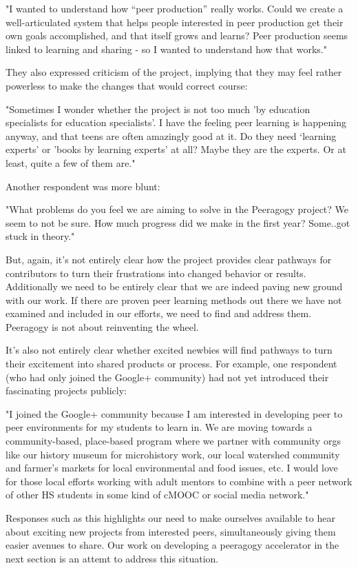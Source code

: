 \documentclass{acm_proc_article-sp}
\begin{document}
"I wanted to understand how ``peer production'' really works. Could we create a well-articulated system that helps people interested in peer production get their own goals accomplished, and that itself grows and learns? Peer production seems linked to learning and sharing - so I wanted to understand how that works."

They also expressed criticism of the project, implying that they may feel rather powerless to make the changes that would correct course:

"Sometimes I wonder whether the project is not too much 'by education specialists for education specialists'. I have the feeling peer learning is happening anyway, and that teens are often amazingly good at it. Do they need `learning experts' or 'books by learning experts' at all? Maybe they are the experts. Or at least, quite a few of them are."

Another respondent was more blunt:

"What problems do you feel we are aiming to solve in the Peeragogy project? We seem to not be sure. How much progress did we make in the first year? Some..got stuck in theory."

But, again, it's not entirely clear how the project provides clear pathways for contributors to turn their frustrations into changed behavior or results. Additionally we need to be entirely clear that we are indeed paving new ground with our work. If there are proven peer learning methods out there we have not examined and included in our efforts, we need to find and address them. Peeragogy is not about reinventing the wheel.

It's also not entirely clear whether excited newbies will find pathways to turn their excitement into shared products or process. For example, one respondent (who had only joined the Google+ community) had not yet introduced their fascinating projects publicly:

"I joined the Google+ community because I am interested in developing peer to peer environments for my students to learn in. We are moving towards a community-based, place-based program where we partner with community orgs like our history museum for microhistory work, our local watershed community and farmer's markets for local environmental and food issues, etc. I would love for those local efforts working with adult mentors to combine with a peer network of other HS students in some kind of cMOOC or social media network."

Responses such as this highlights our need to make ourselves available to hear about exciting new projects from interested peers, simultaneously giving them easier avenues to share. Our work on developing a peeragogy accelerator in the next section is an attemt to address this situation.
\end{document}

